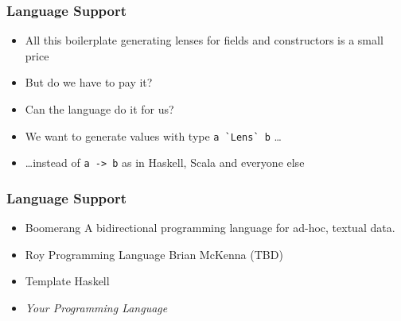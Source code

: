 \begin{frame}
\frametitle{Language Support}

\begin{itemize}
\item All this boilerplate generating lenses for fields and constructors is a small price
\item But do we have to pay it?
\item Can the language do it for us?
\item We want to generate values with type \lstinline$a `Lens` b$ \ldots
\item \ldots instead of \lstinline$a -> b$ as in Haskell, Scala and everyone else
\end{itemize}

\end{frame}

\begin{frame}
\frametitle{Language Support}

\begin{itemize}
\item Boomerang \textemdash A bidirectional programming language for ad-hoc, textual data. 
\item Roy Programming Language \textemdash Brian McKenna (TBD)
\item Template Haskell
\item \emph{Your Programming Language}
\end{itemize}

\end{frame}

